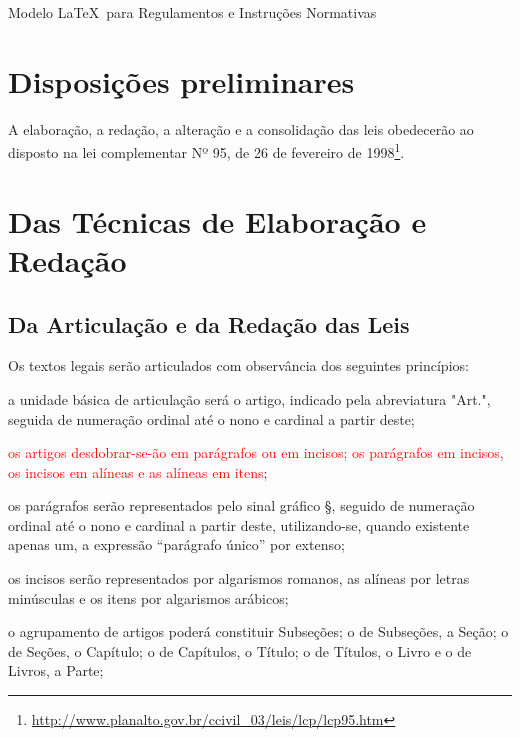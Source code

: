 \documentclass[11pt,twoside,a4paper]{inifsc}
\begin{document}
\begin{normativa}{Modelo \LaTeX~para Regulamentos e Instruções Normativas}

\chapter{Disposições preliminares}

\begin{artigo}
    \item A elaboração, a redação, a alteração e a consolidação das leis obedecerão ao disposto na lei complementar Nº 95, de 26 de fevereiro de 1998\footnote{\url{http://www.planalto.gov.br/ccivil_03/leis/lcp/lcp95.htm}}.

\end{artigo}



\chapter{Das Técnicas de Elaboração e Redação}


\section{Da Articulação e da Redação das Leis}


\begin{artigo}
    \item \label{art:observancia}
    Os textos legais serão articulados com observância dos seguintes princípios:
    \begin{inciso}
        \item \label{inc:formatoartigo}
         a unidade básica de articulação será o artigo, indicado pela abreviatura "Art.", seguida de numeração ordinal até o nono e cardinal a partir deste;
        \item \textcolor{red}{os artigos desdobrar-se-ão em parágrafos ou em incisos; os parágrafos em incisos, os incisos em alíneas e as alíneas em itens};
        \item os parágrafos serão representados pelo sinal gráfico §, seguido de numeração ordinal até o nono e cardinal a partir deste, utilizando-se, quando existente apenas um, a expressão ``parágrafo único'' por extenso;
        \item os incisos serão representados por algarismos romanos, as alíneas por letras minúsculas e os itens por algarismos arábicos;
        \item o agrupamento de artigos poderá constituir Subseções; o de Subseções, a Seção; o de Seções, o Capítulo; o de Capítulos, o Título; o de Títulos, o Livro e o de Livros, a Parte;
    \end{inciso}


\end{artigo}
\end{normativa}
\end{document}
